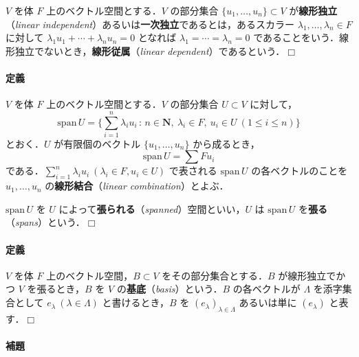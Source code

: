\documentclass[10pt,b5paper,pandoc]{bxjsarticle}
\let\oldparagraph\paragraph
\renewcommand{\paragraph}[1]{\oldparagraph{#1}\mbox{}}
\begin{document}
\(V\) を体 \(F\) 上のベクトル空間とする．\(V\) の部分集合
\(\{ u_1, \dotsc, u_n \} \subset V\) が\textbf{線形独立}（\emph{linear
independent}）あるいは\textbf{一次独立}であるとは，あるスカラー
\(\lambda_1, \dotsc, \lambda_n \in F\) に対して
\(\lambda_1 u_1 + \dotsb + \lambda_n u_n = 0\) となれば
\(\lambda_1 = \dotsb = \lambda_n = 0\)
であることをいう．線形独立でないとき，\textbf{線形従属}（\emph{linear
dependent}）であるという．\(\Box\)

\hypertarget{spanned-space}{%
\paragraph{定義}\label{spanned-space}}

\(V\) を体 \(F\) 上のベクトル空間とする．\(V\) の部分集合
\(U \subset V\) に対して， \[
\mathrm{span}\,U = \{ \sum_{i = 1}^n \lambda_i u_i \,:\,n \in \boldsymbol N,\ \lambda_i \in F,\ u_i \in U \ (1 \le i \le n) \}
\] とおく．\(U\) が有限個のベクトル \(\{ u_1, \dotsc, u_n \}\)
から成るとき， \[
\mathrm{span}\,U = \sum Fu_i
\]
である．\(\sum_{i = 1}^n \lambda_i u_i \ (\lambda_i \in F, u_i \in U)\)
で表される \(\mathrm{span}\,U\) の各ベクトルのことを
\(u_1, \dotsc, u_n\) の\textbf{線形結合}（\emph{linear
combination}）とよぶ．

\(\mathrm{span}\,U\) を \(U\)
によって\textbf{張られる}（\emph{spanned}）空間といい，\(U\) は
\(\mathrm{span}\,U\) を\textbf{張る}（\emph{spans}）という．\(\Box\)

\hypertarget{basis-for-vector-space}{%
\paragraph{定義}\label{basis-for-vector-space}}

\(V\) を体 \(F\) 上のベクトル空間，\(B \subset V\)
をその部分集合とする．\(B\) が線形独立でかつ \(V\) を張るとき，\(B\) を
\(V\) の\textbf{基底}（\emph{basis}）という．\(B\) の各ベクトルが
\(\Lambda\) を添字集合として \(e_\lambda \ (\lambda \in \Lambda)\)
と書けるとき，\(B\) を \((e_\lambda)_{\lambda \in \Lambda}\)
あるいは単に \((e_\lambda)\) と表す．\(\Box\)

\hypertarget{number-of-basis-is-inv}{%
\paragraph{補題}\label{number-of-basis-is-inv}}
\end{document}
